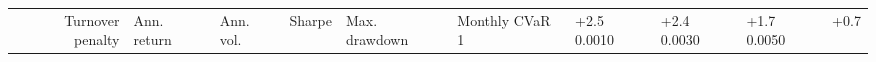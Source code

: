 \begin{tabular}{rlllllll}
\toprule
Turnover penalty & Ann. return & Ann. vol. & Sharpe & Max. drawdown & Monthly CVaR 1%
 & +2.5%
0.0010 & +2.4%
0.0030 & +1.7%
0.0050 & +0.7%
\bottomrule
\end{tabular}
